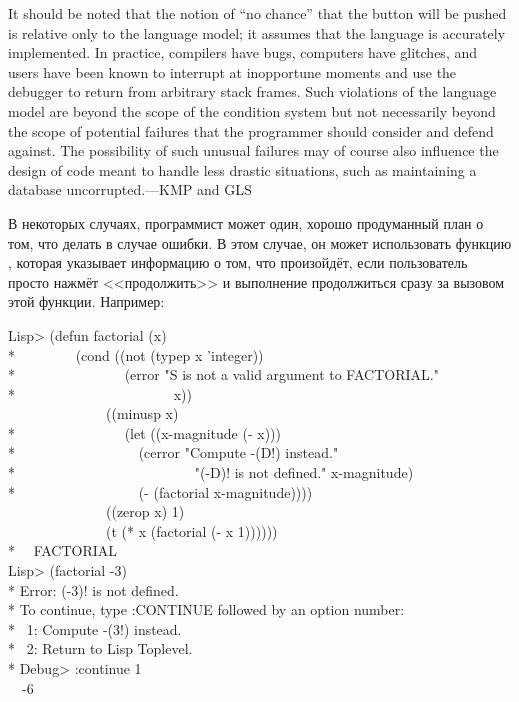 \beforenoterule
\begin{sideremark}
It should be noted that the notion of
``no chance'' that the button will be pushed is relative only to the language
model; it assumes that the language is accurately implemented.  In practice,
compilers have bugs, computers have glitches, and users have been known
to interrupt at inopportune moments and use the debugger to return from
arbitrary stack frames.  Such violations of the language model are
beyond the scope of the condition system but not necessarily beyond the
scope of potential failures that the programmer should consider and defend against.
The possibility of such unusual failures may of course also influence the design of
code meant to handle less drastic situations,
such as maintaining a database uncorrupted.---KMP and GLS
\end{sideremark}
\afternoterule

В некоторых случаях, программист может один, хорошо продуманный план о том, что
делать в случае ошибки. В этом случае, он может использовать функцию
, которая указывает информацию о том, что произойдёт, если
пользователь просто нажмёт <<продолжить>> и выполнение продолжиться сразу за
вызовом этой функции. Например:
\begin{lisp}
Lisp> (defun factorial (x) \\*
~~~~~~~~(cond ((not (typep x 'integer)) \\*
~~~~~~~~~~~~~~~(error "{\Xtilde}S is not a valid argument to FACTORIAL." \\*
~~~~~~~~~~~~~~~~~~~~~~x)) \\
~~~~~~~~~~~~~~((minusp x) \\*
~~~~~~~~~~~~~~~(let ((x-magnitude (- x))) \\*
~~~~~~~~~~~~~~~~~(cerror "Compute -({\Xtilde}D!) instead." \\*
~~~~~~~~~~~~~~~~~~~~~~~~~"(-{\Xtilde}D)! is not defined." x-magnitude) \\*
~~~~~~~~~~~~~~~~~(- (factorial x-magnitude)))) \\
~~~~~~~~~~~~~~((zerop x) 1) \\
~~~~~~~~~~~~~~(t (* x (factorial (- x 1)))))) \\*
~\EV\ FACTORIAL \\
Lisp> (factorial -3) \\*
Error: (-3)! is not defined. \\*
To continue, type :CONTINUE followed by an option number: \\*
~1: Compute -(3!) instead. \\*
~2: Return to Lisp Toplevel. \\*
Debug> :continue 1 \\
~\EV\ -6
\end{lisp}

